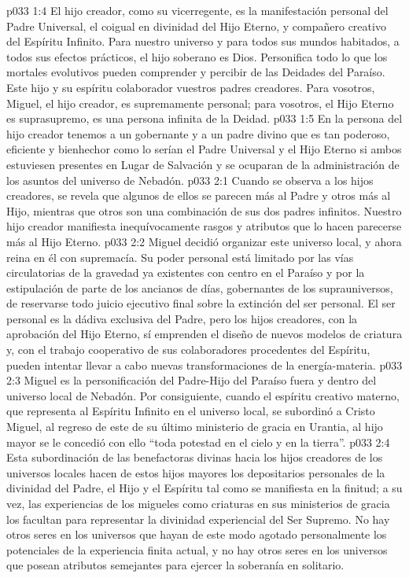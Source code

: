 \vs p033 1:4 El hijo creador, como su vicerregente, es la manifestación personal del Padre Universal, el coigual en divinidad del Hijo Eterno, y compañero creativo del Espíritu Infinito. Para nuestro universo y para todos sus mundos habitados, a todos sus efectos prácticos, el hijo soberano es Dios. Personifica todo lo que los mortales evolutivos pueden comprender y percibir de las Deidades del Paraíso. Este hijo y su espíritu colaborador  vuestros padres creadores. Para vosotros, Miguel, el hijo creador, es supremamente personal; para vosotros, el Hijo Eterno es suprasupremo, es una persona infinita de la Deidad.
\vs p033 1:5 \pc En la persona del hijo creador tenemos a un gobernante y a un padre divino que es tan poderoso, eficiente y bienhechor como lo serían el Padre Universal y el Hijo Eterno si ambos estuviesen presentes en Lugar de Salvación y se ocuparan de la administración de los asuntos del universo de Nebadón.
\vs p033 2:1 Cuando se observa a los hijos creadores, se revela que algunos de ellos se parecen más al Padre y otros más al Hijo, mientras que otros son una combinación de sus dos padres infinitos. Nuestro hijo creador manifiesta inequívocamente rasgos y atributos que lo hacen parecerse más al Hijo Eterno.
\vs p033 2:2 Miguel decidió organizar este universo local, y ahora reina en él con supremacía. Su poder personal está limitado por las vías circulatorias de la gravedad ya existentes con centro en el Paraíso y por la estipulación de parte de los ancianos de días, gobernantes de los suprauniversos, de reservarse todo juicio ejecutivo final sobre la extinción del ser personal. El ser personal es la dádiva exclusiva del Padre, pero los hijos creadores, con la aprobación del Hijo Eterno, sí emprenden el diseño de nuevos modelos de criatura y, con el trabajo cooperativo de sus colaboradores procedentes del Espíritu, pueden intentar llevar a cabo nuevas transformaciones de la energía\hyp{}materia.
\vs p033 2:3 \pc Miguel es la personificación del Padre\hyp{}Hijo del Paraíso fuera y dentro del universo local de Nebadón. Por consiguiente, cuando el espíritu creativo materno, que representa al Espíritu Infinito en el universo local, se subordinó a Cristo Miguel, al regreso de este de su último ministerio de gracia en Urantia, al hijo mayor se le concedió con ello “toda potestad en el cielo y en la tierra”.
\vs p033 2:4 Esta subordinación de las benefactoras divinas hacia los hijos creadores de los universos locales hacen de estos hijos mayores los depositarios personales de la divinidad del Padre, el Hijo y el Espíritu tal como se manifiesta en la finitud; a su vez, las experiencias de los migueles como criaturas en sus ministerios de gracia los facultan para representar la divinidad experiencial del Ser Supremo. No hay otros seres en los universos que hayan de este modo agotado personalmente los potenciales de la experiencia finita actual, y no hay otros seres en los universos que posean atributos semejantes para ejercer la soberanía en solitario.
